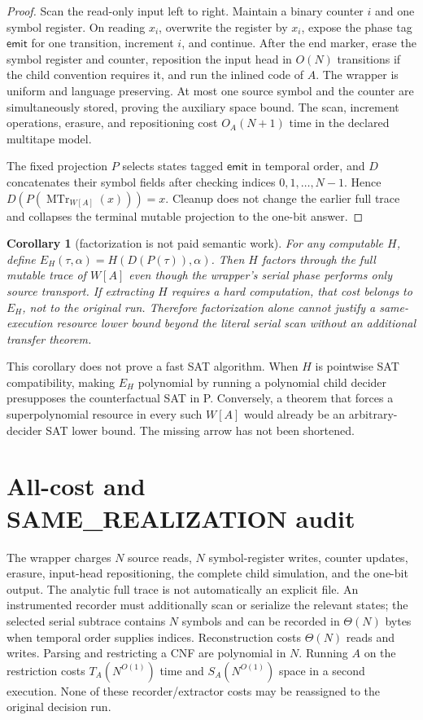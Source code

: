 \documentclass[11pt]{article}
\newtheorem{corollary}[theorem]{Corollary}
\begin{document}
\begin{proof}
Scan the read-only input left to right.  Maintain a binary counter $i$ and one
symbol register.  On reading $x_i$, overwrite the register by $x_i$, expose
the phase tag $\mathsf{emit}$ for one transition, increment $i$, and continue.
After the end marker, erase the symbol register and counter, reposition the
input head in $O(N)$ transitions if the child convention requires it, and
run the inlined code of $A$.  The wrapper is uniform and language preserving.
At most one source symbol and the counter are simultaneously stored, proving
the auxiliary space bound.  The scan, increment operations, erasure, and
repositioning cost $O_A(N+1)$ time in the declared multitape model.

The fixed projection $P$ selects states tagged $\mathsf{emit}$ in temporal
order, and $D$ concatenates their symbol fields after checking indices
$0,1,\ldots,N-1$.  Hence $D(P(\operatorname{MTr}_{W[A]}(x)))=x$.  Cleanup
does not change the earlier full trace and collapses the terminal mutable
projection to the one-bit answer.
\end{proof}

\begin{corollary}[factorization is not paid semantic work]
For any computable $H$, define $E_H(\tau,\alpha)=H(D(P(\tau)),\alpha)$.
Then $H$ factors through the full mutable trace of $W[A]$ even though the
wrapper's serial phase performs only source transport.  If extracting $H$
requires a hard computation, that cost belongs to $E_H$, not to the original
run.  Therefore factorization alone cannot justify a same-execution resource
lower bound beyond the literal serial scan without an additional transfer
theorem.
\end{corollary}

This corollary does not prove a fast SAT algorithm.  When $H$ is pointwise
SAT compatibility, making $E_H$ polynomial by running a polynomial child
decider presupposes the counterfactual SAT in P.  Conversely, a theorem that
forces a superpolynomial resource in every such $W[A]$ would already be an
arbitrary-decider SAT lower bound.  The missing arrow has not been shortened.

\section{All-cost and SAME\_REALIZATION audit}

The wrapper charges $N$ source reads, $N$ symbol-register writes, counter
updates, erasure, input-head repositioning, the complete child simulation,
and the one-bit output.  The analytic full trace is not automatically an
explicit file.  An instrumented recorder must additionally scan or serialize
the relevant states; the selected serial subtrace contains $N$ symbols and
can be recorded in $\Theta(N)$ bytes when temporal order supplies indices.
Reconstruction costs $\Theta(N)$ reads and writes.  Parsing and restricting a
CNF are polynomial in $N$.  Running $A$ on the restriction costs
$T_A(N^{O(1)})$ time and $S_A(N^{O(1)})$ space in a second execution.  None of
these recorder/extractor costs may be reassigned to the original decision run.
\end{document}
